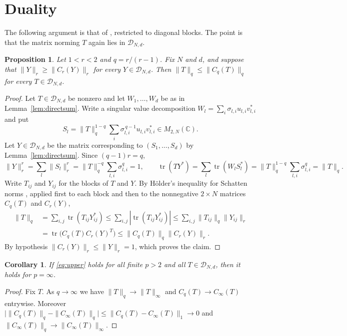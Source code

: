 \documentclass[11pt]{amsart}
\newtheorem{proposition}[theorem]{Proposition}
\newtheorem{corollary}[theorem]{Corollary}
\theoremstyle{definition}
\theoremstyle{remark}
\numberwithin{equation}{section}
\newcommand{\C}{\mathbb{C}}
\newcommand{\tr}{\operatorname{tr}}
\newcommand{\cD}{\mathcal{D}}
\begin{document}
\section{Duality}\label{sec:duality}

The following argument is that of \cite[Section~2.1]{Aud08}, restricted to diagonal blocks. The point is that the matrix norming $T$ again lies in $\cD_{N,d}$.

\begin{proposition}\label{prop:duality}
Let $1<r<2$ and $q=r/(r-1)$. Fix $N$ and $d$, and suppose that $\|Y\|_r\ge\|C_r(Y)\|_r$ for every $Y\in\cD_{N,d}$. Then $\|T\|_q\le\|C_q(T)\|_q$ for every $T\in\cD_{N,d}$.
\end{proposition}

\begin{proof}
Let $T\in\cD_{N,d}$ be nonzero and let $W_1,\dots,W_d$ be as in Lemma~\ref{lem:directsum}. Write a singular value decomposition $W_l=\sum_i\sigma_{l,i}u_{l,i}v_{l,i}^*$ and put
\[
S_l=\|T\|_q^{1-q}\sum_i\sigma_{l,i}^{\,q-1}u_{l,i}v_{l,i}^*\in M_{2,N}(\C).
\]
Let $Y\in\cD_{N,d}$ be the matrix corresponding to $(S_1,\dots,S_d)$ by Lemma~\ref{lem:directsum}. Since $(q-1)r=q$,
\[
\|Y\|_r^r=\sum_l\|S_l\|_r^r=\|T\|_q^{-q}\sum_{l,i}\sigma_{l,i}^q=1,\qquad
\tr(TY^*)=\sum_l\tr(W_lS_l^*)=\|T\|_q^{1-q}\sum_{l,i}\sigma_{l,i}^q=\|T\|_q .
\]
Write $T_{ij}$ and $Y_{ij}$ for the blocks of $T$ and $Y$. By H\"older's inequality for Schatten norms \cite[Chapter~IV]{Bha97}, applied first to each block and then to the nonnegative $2\times N$ matrices $C_q(T)$ and $C_r(Y)$,
\begin{align*}
\|T\|_q&=\sum_{i,j}\tr(T_{ij}Y_{ij}^*)\le\sum_{i,j}|\tr(T_{ij}Y_{ij}^*)|\le\sum_{i,j}\|T_{ij}\|_q\|Y_{ij}\|_r\\
&=\tr\bigl(C_q(T)C_r(Y)^T\bigr)\le\|C_q(T)\|_q\|C_r(Y)\|_r .
\end{align*}
By hypothesis $\|C_r(Y)\|_r\le\|Y\|_r=1$, which proves the claim.
\end{proof}

\begin{corollary}\label{cor:infty}
If \eqref{eq:upper} holds for all finite $p>2$ and all $T\in\cD_{N,d}$, then it holds for $p=\infty$.
\end{corollary}

\begin{proof}
Fix $T$. As $q\to\infty$ we have $\|T\|_q\to\|T\|_\infty$ and $C_q(T)\to C_\infty(T)$ entrywise. Moreover $\bigl|\|C_q(T)\|_q-\|C_\infty(T)\|_q\bigr|\le\|C_q(T)-C_\infty(T)\|_1\to0$ and $\|C_\infty(T)\|_q\to\|C_\infty(T)\|_\infty$.
\end{proof}
\end{document}
